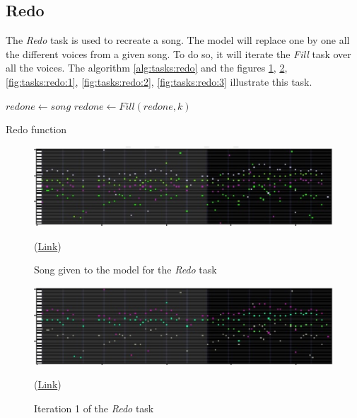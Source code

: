 \documentclass[12pt]{report}
\begin{document}
\subsection{Redo}
\label{sec:tasks:redo}

The \textit{Redo} task is used to recreate a song.
The model will replace one by one all the different voices from a given song.
To do so, it will iterate the \textit{Fill} task over all the voices.
The algorithm \ref{alg:tasks:redo} and the figures \ref{fig:tasks:redo:truth}, \ref{fig:tasks:redo:0}, \ref{fig:tasks:redo:1}, \ref{fig:tasks:redo:2}, \ref{fig:tasks:redo:3} illustrate this task.

\begin{algorithm}
    \begin{algorithmic}[1]
        \Statex
            \State $redone \gets song$
                \State $redone \gets Fill(redone, k)$
            \EndFor
            \State {}
        \EndFunction
        \end{algorithmic}
    \caption{Redo function}
    \label{alg:tasks:redo}
\end{algorithm}


\begin{figure}[htbp]
    \centering
    \includegraphics[width=\textwidth]{images/generated_midis/tasks/redo/task-redo-truth.jpg}
    \caption{Song given to the model for the \textit{Redo} task}
    (\href{https://github.com/ValentinVignal/midiGenerator/blob/master/samples/tasks/redo_truth.mid}{Link})
    \label{fig:tasks:redo:truth}
\end{figure}

\begin{figure}[htbp]
    \centering
    \includegraphics[width=\textwidth]{images/generated_midis/tasks/redo/task-redo-0.jpg}
    \caption{Iteration 1 of the \textit{Redo} task}
    (\href{https://github.com/ValentinVignal/midiGenerator/blob/master/samples/tasks/redo_0_(inst_2).mid}{Link})
    \label{fig:tasks:redo:0}
\end{figure}
\end{document}
